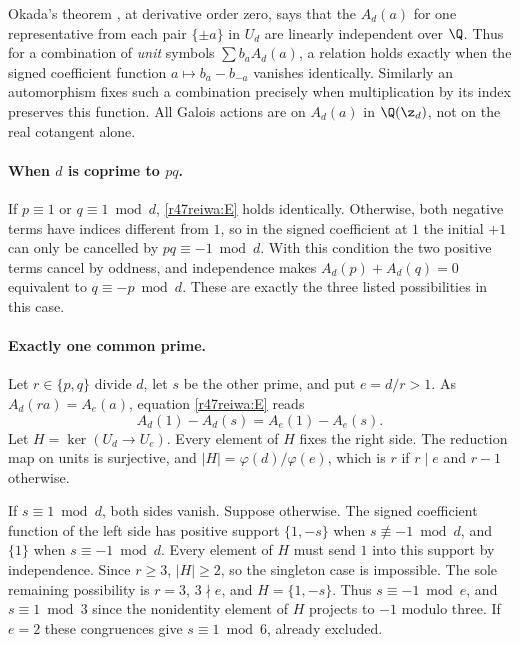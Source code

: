 \documentclass[11pt,a4paper]{article}
\numberwithin{equation}{section}
\theoremstyle{definition}
\theoremstyle{remark}
\begin{document}
Okada's theorem \cite{r47reiwa:O}, at derivative order zero, says that the \(A_d(a)\) for one representative from each pair \(\{\pm a\}\) in \(U_d\) are linearly independent over \(\Q\). Thus for a combination of \emph{unit} symbols \(\sum b_a A_d(a)\), a relation holds exactly when the signed coefficient function \(a\mapsto b_a-b_{-a}\) vanishes identically. Similarly an automorphism fixes such a combination precisely when multiplication by its index preserves this function. All Galois actions are on \(A_d(a)\) in \(\Q(\z_d)\), not on the real cotangent alone.

\paragraph{When \(d\) is coprime to \(pq\).}
If \(p\equiv1\) or \(q\equiv1\bmod d\), \eqref{r47reiwa:E} holds identically. Otherwise, both negative terms have indices different from \(1\), so in the signed coefficient at \(1\) the initial \(+1\) can only be cancelled by \(pq\equiv-1\bmod d\). With this condition the two positive terms cancel by oddness, and independence makes \(A_d(p)+A_d(q)=0\) equivalent to \(q\equiv-p\bmod d\). These are exactly the three listed possibilities in this case.

\paragraph{Exactly one common prime.}
Let \(r\in\{p,q\}\) divide \(d\), let \(s\) be the other prime, and put \(e=d/r>1\).
As \(A_d(ra)=A_e(a)\), equation \eqref{r47reiwa:E} reads
\begin{equation}\label{r47reiwa:R}
 A_d(1)-A_d(s)=A_e(1)-A_e(s).
\end{equation}
Let \(H=\ker(U_d\to U_e)\). Every element of \(H\) fixes the right side. The reduction map on units is surjective, and \(|H|=\varphi(d)/\varphi(e)\), which is \(r\) if \(r\mid e\) and \(r-1\) otherwise.

If \(s\equiv1\bmod d\), both sides vanish. Suppose otherwise. The signed coefficient function of the left side has positive support \(\{1,-s\}\) when \(s\not\equiv-1\bmod d\), and \(\{1\}\) when \(s\equiv-1\bmod d\). Every element of \(H\) must send \(1\) into this support by independence. Since \(r\ge3\), \(|H|\ge2\), so the singleton case is impossible. The sole remaining possibility is \(r=3\), \(3\nmid e\), and \(H=\{1,-s\}\). Thus \(s\equiv-1\bmod e\), and \(s\equiv1\bmod3\) since the nonidentity element of \(H\) projects to \(-1\) modulo three. If \(e=2\) these congruences give \(s\equiv1\bmod6\), already excluded.
\end{document}
